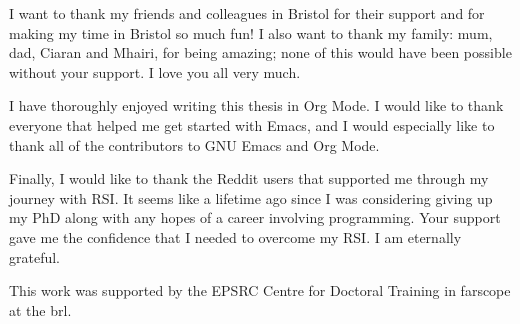 \documentclass{mimosis-class/mimosis}
\numberwithin{equation}{chapter}
\begin{document}
\begin{singlespace}




I want to thank my friends and colleagues in Bristol for their support and for making my time in Bristol so much fun!
I also want to thank my family: mum, dad, Ciaran and Mhairi, for being amazing;
none of this would have been possible without your support.
I love you all very much.

I have thoroughly enjoyed writing this thesis in Org Mode.
I would like to thank everyone that helped me get started with Emacs, and
I would especially like to thank all of the contributors to GNU Emacs and Org Mode.

Finally, I would like to thank the Reddit users that supported me through my journey with RSI.
It seems like a lifetime ago since I was considering giving up my PhD along with any hopes of a career
involving programming.
Your support gave me the confidence that I needed to overcome my RSI. I am eternally grateful.


This work was supported by the EPSRC Centre for Doctoral Training in \acrfull{farscope} at the \acrfull{brl}.

\end{singlespace}
\tableofcontents
%
\listoftables
%
\listoffigures

\printglossary[type=\acronymtype]
\end{document}
